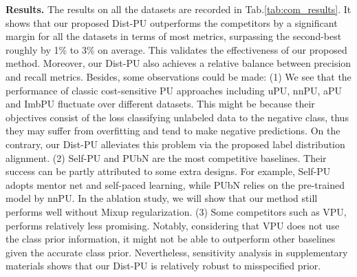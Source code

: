 \documentclass[final]{cvpr}
\newcommand{\bangyan}[1]{#1}
\newcommand{\yunrui}[1]{#1}
\begin{document}
\textbf{Results.} \bangyan{The results on all the datasets are recorded} in Tab.\ref{tab:com_results}. \bangyan{It shows that our proposed} Dist-PU outperforms the competitors by a significant margin for all the datasets \bangyan{in terms of most metrics}, surpassing the second-best roughly by 1\% to 3\% on average. This validates the \bangyan{effectiveness} of our proposed method. Moreover, our Dist-PU also achieves a relative balance between precision and recall metrics. Besides, some observations could be made: (1) We see that the performance of classic cost-sensitive PU approaches including uPU, nnPU, aPU and ImbPU fluctuate over different datasets. This might be because their objectives consist of the loss classifying unlabeled data to the negative class, thus they may suffer from overfitting and tend to make negative predictions. On the contrary, our Dist-PU alleviates this problem via the proposed label distribution alignment. (2) Self-PU and PUbN are the most competitive baselines. Their success can be partly attributed to some extra designs. For example, Self-PU adopts mentor net and self-paced learning, while PUbN relies on the pre-trained model by nnPU. In the ablation study, we will show that our method still performs well without Mixup regularization.
(3) Some competitors such as VPU, performs relatively less promising. 
Notably, considering that VPU does not use the class prior information, it might not be able to outperform other baselines given the accurate class prior. Nevertheless, sensitivity analysis in supplementary materials shows that our Dist-PU is relatively robust to misspecified prior.




\end{document}

